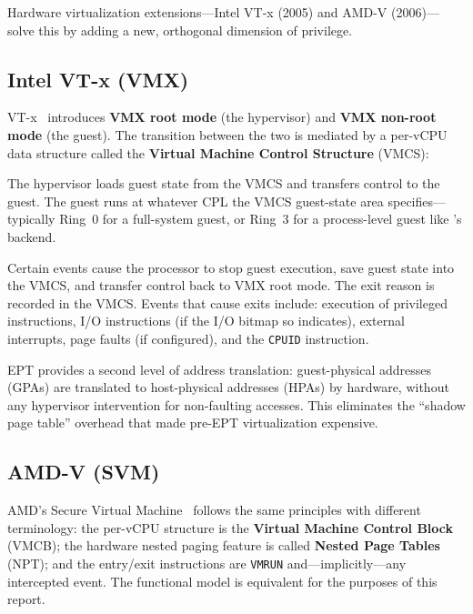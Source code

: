 Hardware virtualization extensions---Intel VT-x (2005) and AMD-V
(2006)---solve this by adding a new, orthogonal dimension of privilege.

\subsection{Intel VT-x (VMX)}

VT-x~\cite{intel-sdm} introduces \textbf{VMX root mode} (the
hypervisor) and \textbf{VMX non-root mode} (the guest).  The
transition between the two is mediated by a per-vCPU data structure
called the \textbf{Virtual Machine Control Structure} (VMCS):

\begin{description}[style=nextline]
  \item[VM Entry (\texttt{VMLAUNCH} / \texttt{VMRESUME}).]
    The hypervisor loads guest state from the VMCS and transfers
    control to the guest.  The guest runs at whatever CPL the VMCS
    guest-state area specifies---typically Ring~0 for a full-system
    guest, or Ring~3 for a process-level guest like \UML{}'s \KVM{}
    backend.

  \item[VM Exit.]
    Certain events cause the processor to stop guest execution,
    save guest state into the VMCS, and transfer control back to
    VMX root mode.  The exit reason is recorded in the VMCS.
    Events that cause exits include: execution of privileged
    instructions, I/O instructions (if the I/O bitmap so indicates),
    external interrupts, page faults (if configured), and the
    \texttt{CPUID} instruction.

  \item[Extended Page Tables (EPT).]
    EPT provides a second level of address translation: guest-physical
    addresses (GPAs) are translated to host-physical addresses (HPAs)
    by hardware, without any hypervisor intervention for non-faulting
    accesses.  This eliminates the ``shadow page table'' overhead that
    made pre-EPT virtualization expensive.
\end{description}

\subsection{AMD-V (SVM)}

AMD's Secure Virtual Machine~\cite{amd-apm} follows the same
principles with different terminology: the per-vCPU structure is the
\textbf{Virtual Machine Control Block} (VMCB); the hardware nested
paging feature is called \textbf{Nested Page Tables} (NPT); and the
entry/exit instructions are \texttt{VMRUN} and---implicitly---any
intercepted event.  The functional model is equivalent for the
purposes of this report.

